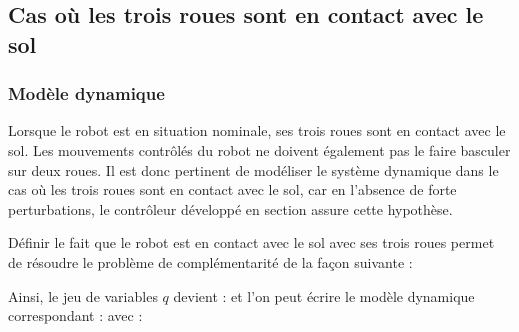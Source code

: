 		\subsection{Cas où les trois roues sont en contact avec le sol}
			\label{section.modelisation_trois_roues}
			
			\subsubsection{Modèle dynamique}
				
				Lorsque le robot est en situation nominale, ses trois roues sont en contact avec le sol. 
				Les mouvements contrôlés du robot ne doivent également pas le faire basculer sur deux roues.
				Il est donc pertinent de modéliser le système dynamique dans le cas où les trois roues sont en contact avec le sol, 
				car en l'absence de forte perturbations, le contrôleur développé en section  assure cette hypothèse.
			
				Définir le fait que le robot est en contact avec le sol avec ses trois roues permet de résoudre le problème de complémentarité de la façon suivante :
				
				Ainsi, le jeu de variables $q$ devient :
				et l'on peut écrire le modèle dynamique correspondant :
				avec :			
			
